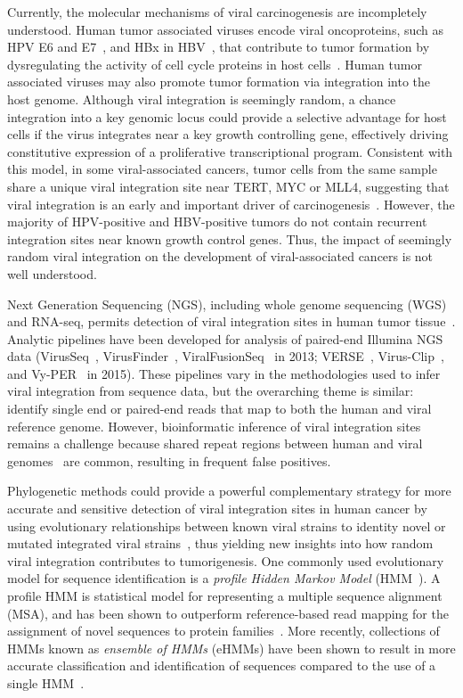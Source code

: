 \documentclass[a4,center,fleqn]{NAR}
\begin{document}
Currently, the molecular mechanisms of viral carcinogenesis are incompletely understood. 
Human tumor associated viruses encode viral oncoproteins, such as HPV E6 and E7~\cite{Duensing2002,Yim2005}, and HBx in HBV~\cite{Zhang2012}, that contribute to tumor formation by dysregulating the activity of cell cycle proteins in host cells~\cite{Carrillo-InfanteCAbbadessa2007,Moore2010,Mesri2014}. Human tumor associated viruses may also promote tumor formation via integration into the host genome. Although viral integration is seemingly random, a chance integration into a key genomic locus could provide a selective advantage for host cells if the virus integrates near a key growth controlling gene, effectively driving constitutive expression of a proliferative transcriptional program. Consistent with this model, in some viral-associated cancers, tumor cells from the same sample share a unique viral integration site near TERT, MYC or MLL4, suggesting that viral integration is an early and important driver of carcinogenesis~\cite{Moore2010}. However, the majority of HPV-positive and HBV-positive tumors do not contain recurrent integration sites near known growth control genes.  Thus, the impact of seemingly random viral integration on the development of viral-associated cancers is not well understood. 

Next Generation Sequencing (NGS), including whole genome sequencing (WGS) and RNA-seq, permits detection of viral integration sites in human tumor tissue~\cite{Duncavage2011,Chandrani2015}.  Analytic pipelines have been developed for analysis of paired-end Illumina NGS data (VirusSeq~\cite{Chen2013},
VirusFinder~\cite{Wang2013}, ViralFusionSeq~\cite{Li2013} in 2013;
VERSE~\cite{Wang2015}, Virus-Clip~\cite{Ho2015}, and
Vy-PER~\cite{Forster2015} in 2015).  These pipelines vary in the methodologies used to infer viral integration from sequence data, but the overarching theme is similar: identify
single end or paired-end reads that map to both the human and viral
reference genome. However, bioinformatic inference of viral integration sites remains a challenge because shared repeat regions between human and viral genomes~\cite{Forster2015} are common, resulting in frequent false positives.  

Phylogenetic methods could provide a powerful complementary strategy for more accurate and sensitive detection of viral integration sites in human cancer by using evolutionary relationships between known viral strains to identity novel or mutated integrated viral strains~\cite{Matsen2010a}, thus yielding new insights into how random viral integration contributes to tumorigenesis.  One commonly used evolutionary model for sequence identification is a \emph{profile Hidden Markov Model} (HMM~\cite{Eddy1998}).  A profile HMM is statistical model for representing a multiple sequence alignment (MSA), and has been shown to outperform reference-based read mapping for the assignment of novel sequences to protein families~\cite{Skewes-Cox2014}.  More recently, collections of HMMs known as \emph{ensemble of HMMs} (eHMMs) have been shown to result in more accurate classification and identification of sequences compared to the use of a single HMM~\cite{Nguyen2014,Nguyen2016_hippi}.
 
\end{document}
